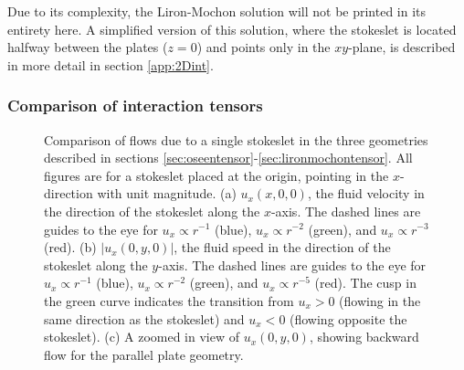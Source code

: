 \documentclass[11pt]{ucthesis}
\begin{document}
Due to its complexity, the Liron-Mochon solution will not be printed in its entirety here. A simplified version of this solution, where the stokeslet is located halfway between the plates ($z=0$) and points only in the $xy$-plane, is described in more detail in section \ref{app:2Dint}.

\subsubsection{Comparison of interaction tensors}

\begin{figure}
\centering
{}
\caption{Comparison of flows due to a single stokeslet in the three geometries described in sections \ref{sec:oseentensor}-\ref{sec:lironmochontensor}. All figures are for a stokeslet placed at the origin, pointing in the $x$-direction with unit magnitude. (a) $u_x(x,0,0)$, the fluid velocity in the direction of the stokeslet along the $x$-axis. The dashed lines are guides to the eye for $u_x\propto r^{-1}$ (blue), $u_x\propto r^{-2}$ (green), and $u_x\propto r^{-3}$ (red). (b) $|u_x(0,y,0)|$, the fluid speed in the direction of the stokeslet along the $y$-axis. The dashed lines are guides to the eye for $u_x\propto r^{-1}$ (blue), $u_x\propto r^{-2}$ (green), and $u_x\propto r^{-5}$ (red). The cusp in the green curve indicates the transition from $u_x>0$ (flowing in the same direction as the stokeslet) and $u_x<0$ (flowing opposite the stokeslet). (c) A zoomed in view of $u_x(0,y,0)$, showing backward flow for the parallel plate geometry.
\label{fig:tensor_comparison}
}
\end{figure}
\end{document}
